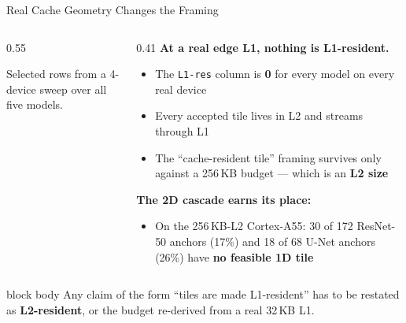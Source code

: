 \documentclass[10pt,aspectratio=169]{beamer}
\begin{document}
\begin{frame}{Real Cache Geometry Changes the Framing}
\begin{columns}[T,totalwidth=0.99\textwidth]
\begin{column}{0.55\textwidth}
\centering
{}

\vspace{0.15cm}
\footnotesize Selected rows from a 4-device sweep over all five models.
\end{column}

\begin{column}{0.41\textwidth}
\textbf{At a real edge L1, nothing is L1-resident.}
\begin{itemize}
\small
\item The \texttt{L1-res} column is \textbf{0} for every model on every real device
\item Every accepted tile lives in L2 and streams through L1
\item The ``cache-resident tile'' framing survives only against a 256\,KB budget --- which is an \textbf{L2 size}
\end{itemize}

\vspace{0.2cm}
\textbf{The 2D cascade earns its place:}
\begin{itemize}
\small
\item On the 256\,KB-L2 Cortex-A55: 30 of 172 ResNet-50 anchors (17\%) and 18 of 68 U-Net anchors (26\%) have \textbf{no feasible 1D tile}
\end{itemize}
\end{column}
\end{columns}

\vspace{0.1cm}
\begin{beamercolorbox}[sep=0.25em,center,rounded=true,shadow=true]{block body}
\footnotesize
Any claim of the form ``tiles are made L1-resident'' has to be restated as
\textbf{L2-resident}, or the budget re-derived from a real 32\,KB L1.
\end{beamercolorbox}
\end{frame}
\end{document}
